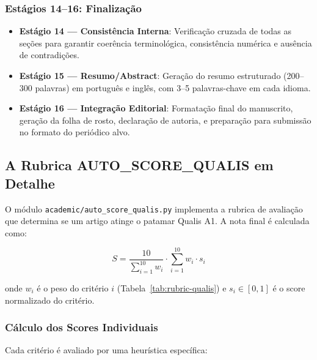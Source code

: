 \subsubsection{Estágios 14--16: Finalização}

\begin{itemize}
  \item \textbf{Estágio 14 — Consistência Interna}: Verificação cruzada de todas as seções para garantir coerência terminológica, consistência numérica e ausência de contradições.
  \item \textbf{Estágio 15 — Resumo/Abstract}: Geração do resumo estruturado (200--300 palavras) em português e inglês, com 3--5 palavras-chave em cada idioma.
  \item \textbf{Estágio 16 — Integração Editorial}: Formatação final do manuscrito, geração da folha de rosto, declaração de autoria, e preparação para submissão no formato do periódico alvo.
\end{itemize}

\subsection{A Rubrica AUTO\_SCORE\_QUALIS em Detalhe}
\label{sec:rubrica-detalhe}

O módulo \texttt{academic/auto\_score\_qualis.py} implementa a rubrica de avaliação que determina se um artigo atinge o patamar Qualis A1. A nota final é calculada como:

\begin{equation}
S = \frac{10}{\sum_{i=1}^{10} w_i} \cdot \sum_{i=1}^{10} w_i \cdot s_i
\label{eq:qualis-score}
\end{equation}

onde $w_i$ é o peso do critério $i$ (Tabela~\ref{tab:rubric-qualis}) e $s_i \in [0, 1]$ é o score normalizado do critério.

\subsubsection{Cálculo dos Scores Individuais}

Cada critério é avaliado por uma heurística específica:


